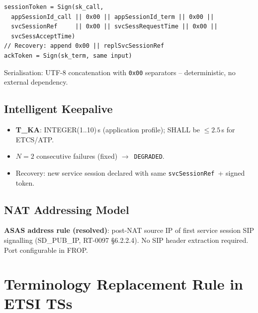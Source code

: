 \documentclass[11pt,a4paper]{article}
\newcommand{\arr}{$\to$}
\newcommand{\svcref}{\texttt{svcSessionRef}}
\begin{document}
\begin{lstlisting}[language={}]
sessionToken = Sign(sk_call,
  appSessionId_call || 0x00 || appSessionId_term || 0x00 ||
  svcSessionRef     || 0x00 || svcSessRequestTime || 0x00 ||
  svcSessAcceptTime)
// Recovery: append 0x00 || replSvcSessionRef
ackToken = Sign(sk_term, same input)
\end{lstlisting}

Serialisation: UTF-8 concatenation with \texttt{0x00} separators -- deterministic,
no external dependency.

\subsection{Intelligent Keepalive}
\label{sec:ka}

\begin{itemize}[leftmargin=2em]
  \item \textbf{T\_KA}: INTEGER(1..10)\,s (application profile);
    SHALL be $\leq 2.5$\,s for ETCS/ATP.
  \item \textbf{$N = 2$} consecutive failures (fixed) \arr\ \texttt{DEGRADED}.
  \item Recovery: new service session declared with same \svcref\ + signed token.
\end{itemize}

\subsection{NAT Addressing Model}
\label{sec:nat}

\textbf{ASAS address rule (resolved)}: post-NAT source IP of first service session
SIP signalling (SD\_PUB\_IP, RT-0097 §6.2.2.4). No SIP header extraction required.
Port configurable in FROP.
\section{Terminology Replacement Rule in ETSI TSs}
\end{document}
